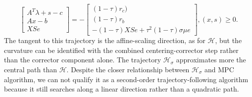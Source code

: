 \documentclass[a4paper,10 pt,titlepage,twoside]{book}
\theoremstyle{plain}
\theoremstyle{definition}
\theoremstyle{remark}
\begin{document}
\begin{equation}\label{Tt}
\begin{bmatrix}
A^{T}\lambda+s-c \\Ax-b \\XSe
\end{bmatrix}=-\begin{bmatrix}
(1-\tau)r_{c})\\(1-\tau)r_{b}\\-(1-\tau)XSe+\tau^{2}(1-\tau)\sigma\mu e
\end{bmatrix},(x,s)\geq0.
\end{equation}
The tangent to this trajectory is the affine-scaling direction, as for $\mathcal{H}$, but the curvature can be identified with the combined centering-corrector step rather than the corrector component alone. The trajectory $\mathcal{H}_{\sigma}$ approximates more the central path than $\mathcal{H}$. Despite the closer relationship between $\mathcal{H}_{\sigma}$  and MPC algorithm, we can not qualify it as a second-order trajectory-following algorithm because it still searches along a linear direction rather than a quadratic path.  
\end{document}
